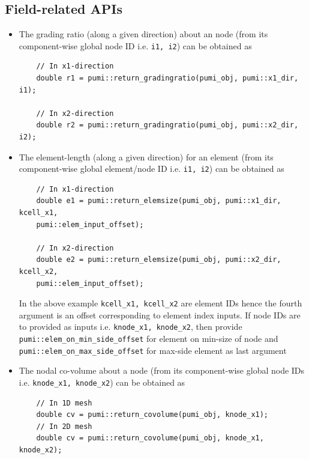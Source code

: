 \documentclass[a4paper,12pt]{article}
\begin{document}
\subsection{Field-related APIs}
\begin{itemize}
	\item The grading ratio (along a given direction) about an node (from its component-wise global node ID i.e. \texttt{i1, i2}) can be obtained as
	\begin{verbatim}
	// In x1-direction
	double r1 = pumi::return_gradingratio(pumi_obj, pumi::x1_dir, i1);
	
	// In x2-direction
	double r2 = pumi::return_gradingratio(pumi_obj, pumi::x2_dir, i2);
	\end{verbatim}
	
	\item The element-length (along a given direction) for an element (from its component-wise global element/node ID i.e. \texttt{i1, i2}) can be obtained as
	\begin{verbatim}
	// In x1-direction
	double e1 = pumi::return_elemsize(pumi_obj, pumi::x1_dir, kcell_x1,
	pumi::elem_input_offset);
	
	// In x2-direction
	double e2 = pumi::return_elemsize(pumi_obj, pumi::x2_dir, kcell_x2,
	pumi::elem_input_offset);
	\end{verbatim}
	In the above example \texttt{kcell\_x1, kcell\_x2} are element IDs hence the fourth argument is an offset corresponding to element index inputs. If node IDs are to provided as inputs i.e. \texttt{knode\_x1, knode\_x2}, then provide \texttt{pumi::elem\_on\_min\_side\_offset} for element on min-size of node and \texttt{pumi::elem\_on\_max\_side\_offset} for max-side element as last argument
	
	\item The nodal co-volume about a node (from its component-wise global node IDs i.e. \texttt{knode\_x1, knode\_x2}) can be obtained as
	\begin{verbatim}
	// In 1D mesh
	double cv = pumi::return_covolume(pumi_obj, knode_x1);
	// In 2D mesh
	double cv = pumi::return_covolume(pumi_obj, knode_x1, knode_x2);
	\end{verbatim}
	

\end{itemize}
\end{document}
